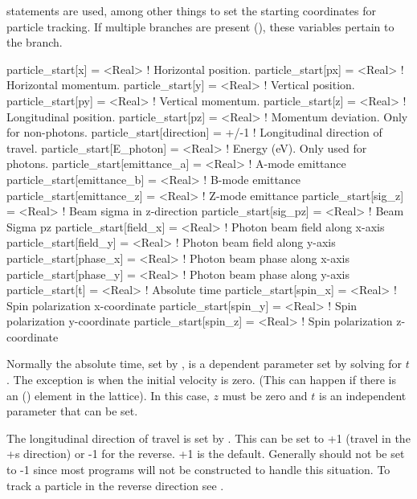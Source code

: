  statements are used, among other things to set the starting coordinates
for particle tracking. If multiple branches are present (), these
variables pertain to the  branch.
\begin{example}
  particle_start[x]                   = <Real>   ! Horizontal position.
  particle_start[px]                  = <Real>   ! Horizontal momentum.
  particle_start[y]                   = <Real>   ! Vertical position.
  particle_start[py]                  = <Real>   ! Vertical momentum.
  particle_start[z]                   = <Real>   ! Longitudinal position.
  particle_start[pz]                  = <Real>   ! Momentum deviation. Only for non-photons.
  particle_start[direction]           = +/-1     ! Longitudinal direction of travel.
  particle_start[E_photon]            = <Real>   ! Energy (eV). Only used for photons.
  particle_start[emittance_a]         = <Real>   ! A-mode emittance
  particle_start[emittance_b]         = <Real>   ! B-mode emittance
  particle_start[emittance_z]         = <Real>   ! Z-mode emittance
  particle_start[sig_z]               = <Real>   ! Beam sigma in z-direction
  particle_start[sig_pz]              = <Real>   ! Beam Sigma pz 
  particle_start[field_x]             = <Real>   ! Photon beam field along x-axis
  particle_start[field_y]             = <Real>   ! Photon beam field along y-axis
  particle_start[phase_x]             = <Real>   ! Photon beam phase along x-axis
  particle_start[phase_y]             = <Real>   ! Photon beam phase along y-axis
  particle_start[t]                   = <Real>   ! Absolute time
  particle_start[spin_x]              = <Real>   ! Spin polarization x-coordinate
  particle_start[spin_y]              = <Real>   ! Spin polarization y-coordinate
  particle_start[spin_z]              = <Real>   ! Spin polarization z-coordinate
\end{example}
Normally the absolute time, set by , is a dependent
parameter set by solving  for $t$. The exception is when the
initial velocity is zero. (This can happen if there is an 
() element in the lattice). In this case, $z$ must be
zero and $t$ is an independent parameter that can be set.

The longitudinal direction of travel is set by .  This can be set
to +1 (travel in the +s direction) or -1 for the reverse.  +1 is the default. Generally
 should not be set to -1 since most programs will not be
constructed to handle this situation. To track a particle in the reverse direction see
. 

